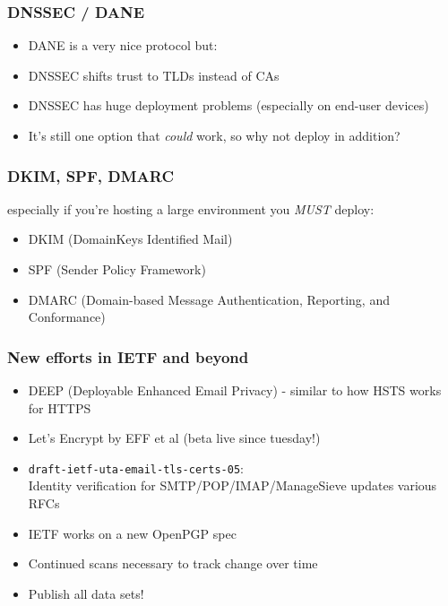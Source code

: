 \documentclass[14pt,aspectratio=43]{beamer}
\begin{document}
\begin{frame}
  \frametitle{DNSSEC / DANE}
  \begin{center}
  \begin{itemize}
    \item DANE is a very nice protocol but:
    \item DNSSEC shifts trust to TLDs instead of CAs
    \item DNSSEC has huge deployment problems (especially on end-user devices)
    \item It's still one option that \emph{could} work, so why not deploy in addition?
  \end{itemize}
  \end{center}
\end{frame}

\begin{frame}
  \frametitle{DKIM, SPF, DMARC}
    especially if you're hosting a large environment you \emph{MUST} deploy:
  \begin{center}
  \begin{itemize}
    \item DKIM (DomainKeys Identified Mail)
    \item SPF (Sender Policy Framework)
    \item DMARC (Domain-based Message Authentication, Reporting, and Conformance)
  \end{itemize}
  \end{center}
\end{frame}

\begin{frame}
  \frametitle{New efforts in IETF and beyond}
  \begin{center}
  \begin{itemize}
    \small
    \item DEEP (Deployable Enhanced Email Privacy) - similar to how HSTS works for HTTPS
    \item Let's Encrypt by EFF et al (beta live since tuesday!)
    \item \texttt{draft-ietf-uta-email-tls-certs-05}:\\ Identity verification for SMTP/POP/IMAP/ManageSieve updates various RFCs
    \item IETF works on a new OpenPGP spec
    \item Continued scans necessary to track change over time
    \item Publish all data sets!
  \end{itemize}
  \end{center}
\end{frame}
\end{document}
